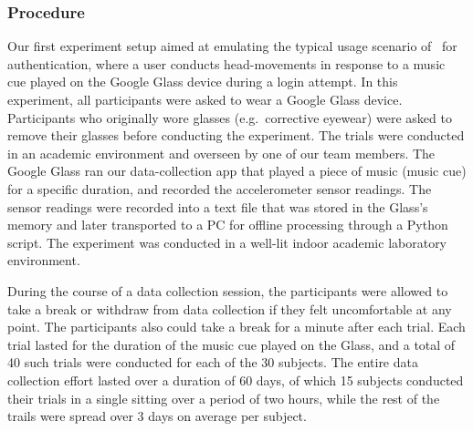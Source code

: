 \subsubsection{Procedure}
Our first experiment setup aimed at emulating the typical usage scenario
of \systemname~for authentication, where a user conducts head-movements in
response to a music cue played on the Google Glass device during a login
attempt.
In this experiment, all participants were asked to wear a Google Glass
device. Participants who originally wore glasses (e.g.~corrective eyewear) were asked to remove their
glasses before conducting the experiment.
The trials were conducted in an academic environment and overseen by one of
our team members.
The Google Glass ran our data-collection app that played a piece of
music (music cue) for a specific duration, and recorded the accelerometer
sensor readings. %
The sensor readings were recorded into a text file that was stored
in the Glass's memory and later transported to a PC for offline processing
through a Python script. The experiment was conducted in a well-lit indoor
academic laboratory environment.

During the course of a data collection session, the participants were allowed to take a
break or withdraw from data collection if they felt uncomfortable at any
point. %
The participants also could take a break for a minute after each trial.
Each trial lasted for the duration of the music cue played on the Glass, and
a total of 40 such trials were conducted for each of the 30 subjects.
The entire data collection effort lasted over a duration of 60 days, of which 15
subjects conducted their trials in a single sitting over a period of two
hours, while the rest of the trails were spread over 3 days on average per
subject.

